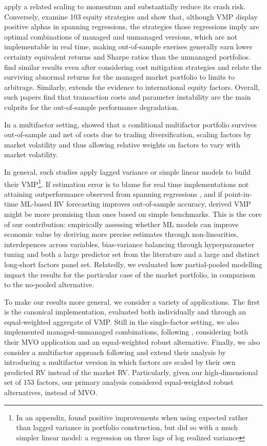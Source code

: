 \documentclass[preprint,12pt,authoryear]{elsarticle}
\begin{document}
\citet{barrososantaclara2015} apply a related scaling to momentum and substantially reduce its crash risk. Conversely, \citet{cederburg2020} examine 103 equity strategies and show that, although VMP display positive alphas in spanning regressions, the strategies those regressions imply are optimal combinations of managed and unmanaged versions, which are not implementable in real time, making  out-of-sample exerises generally earn lower certainty equivalent returns and Sharpe ratios than the unmanaged portfolios. \citet{barrosodetzel2021} find similar results even after considering cost mitigation strategies and relate the surviving abnormal returns for the managed market portfolio to limits to arbitrage. Similarly, \citet{schwarz2025} extends the evidence to international equity factors. Overall, such papers find that transaction costs and parameter instability are the main culprits for the out-of-sample performance degradation.

In a multifactor setting,\citet{demiguelmartinutrerauppal2024} showed that a conditional multifactor portfolio survives out-of-sample and net of costs due to trading diversification, scaling factors by market volatility and thus allowing relative weights on factors to vary with market volatility.

In general, such studies apply lagged variance or simple linear models to build their VMP\footnote{In an appendix, \citet{moreiramuir2017} found positive improvements when using expected rather than lagged variance in portfolio construction, but did so with a much simpler linear model: a regression on three lags of log realized variance}. If estimation error is to blame for real time implementations not attaining outperformance observed from spanning regressions \citep{cederburg2020, schwarz2025}, and if point-in-time ML-based RV forecasting improves out-of-sample accuracy, derived VMP  might be more promising than ones based on simple benchmarks. This is the core of our contribution: empirically assessing whether ML models can improve economic value by deriving more precise estimates through non-linearities, interdepences across variables, bias-variance balancing through hyperparameter tuning and both a large predictor set from the literature and a large and distinct long-short factors panel set. Relatedly, we evaluated how partial-pooled modelling impact the results for the particular case of the market portfolio, in comparison to the no-pooled alternative.

To make our results more general, we consider a variety of applications. The first is the canonical \citet{moreiramuir2017} implementation, evaluated both individually and through an equal-weighted aggregate of VMP. Still in the single-factor setting, we also implemented managed-unmanaged combinations, following \citet{cederburg2020}, considering
both their MVO application and an equal-weighted robust alternative. Finally, we also consider a multifactor approach following \citet{demiguelmartinutrerauppal2024} and extend their analysis by introducing a multifactor version in which factors are scaled by their own predicted RV instead of the market RV. Particularly, given our high-dimensional set of 153 factors, our primary analysis considered equal-weighted robust alternatives, instead of MVO.
\end{document}

